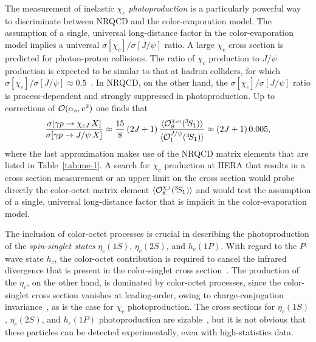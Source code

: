The measurement of inelastic {\em $\chi_c$ photoproduction} is a
particularly powerful way to discriminate between NRQCD and the
color-evaporation model. The assumption of a single, universal
long-distance factor in the color-evaporation model implies a
universal $\sigma[\chi_c]/\sigma[J/\psi]$ ratio.  A large $\chi_c$ cross
section is predicted for photon-proton collisions.  The ratio of
$\chi_c$ production to $J/\psi$ production is expected to be similar to
that at hadron colliders, for which $\sigma[\chi_c] / \sigma[J/\psi]
\approx 0.5$~\cite{Abe:1997yz}. In NRQCD, on the other hand, the
$\sigma[\chi_c]/\sigma[J/\psi]$ ratio is process-dependent and
strongly suppressed in photoproduction. Up to corrections of 
${\cal O}(\alpha_s,v^2)$ one finds that~\cite{Kramer:2001hh}
\begin{equation}
\frac{\sigma[\gamma p \to \chi_{cJ}\,X]}
     {\sigma[\gamma p \to J/\psi \,X]}
\approx \frac{15}{8}\, (2J+1)\, \frac{\langle {\cal O}^{\chi_{c0}}_8
   (^3\!S_1)\rangle}
   {\langle {\cal O}^{J/\psi}_1(^3\!S_1)\rangle}
 \approx (2J+1)\,0.005 ,
\end{equation}
where the last approximation makes use of the NRQCD matrix elements
that are listed in Table~\ref{tab:me-1}. A search for $\chi_c$
production at HERA that results in a cross section measurement or an
upper limit on the cross section would probe directly the color-octet
matrix element $\langle {\cal O}^{\chi_J}_8(^3\!S_1)\rangle$ and would
test the assumption of a single, universal long-distance factor that is
implicit in the color-evaporation model.

The inclusion of color-octet processes is crucial in describing the
photoproduction of the {\em spin-singlet states} $\eta_c(1S)$,
$\eta_c(2S)$, and $h_c(1P)$. With regard to the $P$-wave state $h_c$,
the color-octet contribution is required to cancel the infrared
divergence that is present in the color-singlet cross
section~\cite{Fleming:1998md}. The production of the $\eta_c$, on the
other hand, is dominated by color-octet processes, since the
color-singlet cross section vanishes at leading-order, owing to
charge-conjugation invariance~\cite{Hao:1999kq,Hao:2000ci}, as is the
case for $\chi_c$ photoproduction. The cross sections for $\eta_c(1S)$,
$\eta_c(2S)$, and $h_c(1P)$ photoproduction are
sizable~\cite{Fleming:1998md,Hao:1999kq}, but it is not obvious that
these particles can be detected experimentally, even with
high-statistics data.

